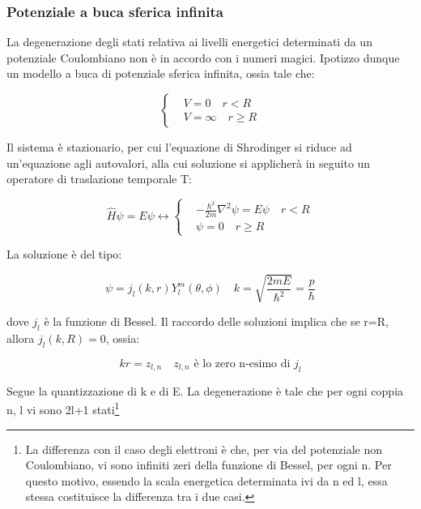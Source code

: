 \documentclass{article}
\begin{document}
\subsubsection{Potenziale a buca sferica infinita}
La degenerazione degli stati relativa ai livelli energetici determinati da un potenziale Coulombiano non è in accordo con
i numeri magici. Ipotizzo dunque un modello a buca di potenziale sferica infinita, ossia tale che:

\begin{equation}
    \left\{
    \begin{aligned}
         & V=0 \quad r<R          \\
         & V=\infty \quad r\geq R
    \end{aligned}
    \right.
\end{equation}

Il sistema è stazionario, per cui l'equazione di Shrodinger si riduce ad un'equazione agli autovalori, alla cui
soluzione si applicherà in seguito un operatore di traslazione temporale T:

\begin{equation}
    \hat{H}\psi=E\psi \leftrightarrow
    \left\{
    \begin{aligned}
         & -\frac{\hbar^2}{2m}\nabla^2\psi= E\psi \quad r<R \\
         & \psi=0 \quad r\geq R
    \end{aligned}
    \right.
\end{equation}

La soluzione è del tipo:

\begin{equation}
    \psi=j_l(k,r)Y^m_l(\theta, \phi) \quad k=\sqrt{\frac{2mE}{\hbar^2}}=\frac{p}{\hbar}
\end{equation}

dove $j_l$ è la funzione di Bessel.
Il raccordo delle soluzioni implica che se r=R, allora $j_l(k,R)=0$, ossia:

\begin{equation}
    kr=z_{l,n} \quad z_{l,n} \text{ è lo zero n-esimo di } j_l
\end{equation}

Segue la quantizzazione di k e di E.
La degenerazione è tale che per ogni coppia n, l vi sono 2l+1 stati\footnote{La differenza con il caso degli elettroni è che, per via del
    potenziale non Coulombiano, vi sono infiniti zeri della funzione di Bessel, per ogni n. Per questo motivo, essendo la scala energetica determinata ivi da n ed l, essa stessa costituisce la differenza tra i due casi. }
\end{document}

